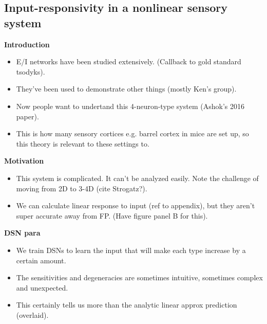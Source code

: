 \documentclass[11pt]{article}
\begin{document}
\subsection{Input-responsivity in a nonlinear sensory system}
\textbf{Introduction}
\begin{itemize}
\item E/I networks have been studied extensively. (Callback to gold standard tsodyks).
\item They've been used to demonstrate other things (mostly Ken's group).
\item Now people want to undertand this 4-neuron-type system (Ashok's 2016 paper).  
\item This is how many sensory cortices e.g. barrel cortex in mice are set up, so this theory is relevant to these settings to.
\end{itemize}

\textbf{Motivation}
\begin{itemize}
\item This system is complicated.  It can't be analyzed easily.  Note the challenge of moving from 2D to 3-4D (cite Strogatz?).
\item We can calculate linear response to input (ref to appendix), but they aren't super accurate away from FP. (Have figure panel B for this).
\end{itemize}

\textbf{DSN para}
\begin{itemize}
\item We train DSNs to learn the input that will make each type increase by a certain amount.
\item The sensitivities and degeneracies are sometimes intuitive, sometimes complex and unexpected.
\item This certainly tells us more than the analytic linear approx prediction (overlaid).
\end{itemize}
\end{document}
